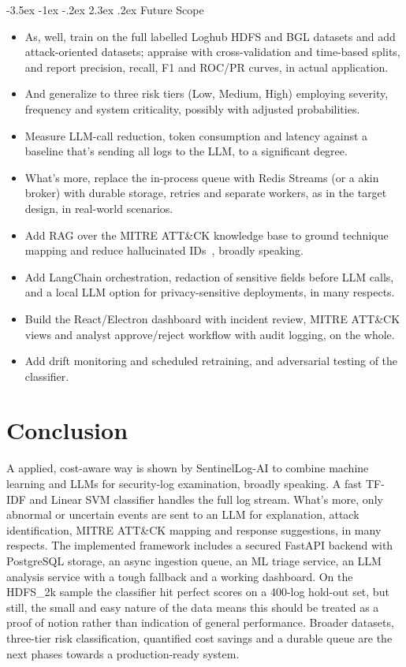 \documentclass[12pt,a4paper]{report}
\makeatletter
\renewcommand\section{\@startsection {section}{1}{\z@}%
  {-3.5ex \@plus -1ex \@minus -.2ex}%
  {2.3ex \@plus .2ex}%
  {\normalfont\fontsize{17}{21}\selectfont\bfseries}}
\makeatother
\begin{document}
\section{Future Scope}
\begin{itemize}[nosep]
  \item As, well, train on the full labelled Loghub HDFS and BGL datasets and add attack-oriented datasets; appraise with cross-validation and time-based splits, and report precision, recall, F1 and ROC/PR curves, in actual application.
  \item And generalize to three risk tiers (Low, Medium, High) employing severity, frequency and system criticality, possibly with adjusted probabilities.
  \item Measure LLM-call reduction, token consumption and latency against a baseline that's sending all logs to the LLM, to a significant degree.
  \item What's more, replace the in-process queue with Redis Streams (or a akin broker) with durable storage, retries and separate workers, as in the target design, in real-world scenarios.
  \item Add RAG over the MITRE ATT\&CK knowledge base to ground technique mapping and reduce hallucinated IDs~\cite{adediran2026}, broadly speaking.
  \item Add LangChain orchestration, redaction of sensitive fields before LLM calls, and a local LLM option for privacy-sensitive deployments, in many respects.
  \item Build the React/Electron dashboard with incident review, MITRE ATT\&CK views and analyst approve/reject workflow with audit logging, on the whole.
  \item Add drift monitoring and scheduled retraining, and adversarial testing of the classifier.
\end{itemize}

\chapter{Conclusion}
A applied, cost-aware way is shown by SentinelLog-AI to combine machine learning and LLMs for security-log examination, broadly speaking. A fast TF-IDF and Linear SVM classifier handles the full log stream. What's more, only abnormal or uncertain events are sent to an LLM for explanation, attack identification, MITRE ATT\&CK mapping and response suggestions, in many respects. The implemented framework includes a secured FastAPI backend with PostgreSQL storage, an async ingestion queue, an ML triage service, an LLM analysis service with a tough fallback and a working dashboard. On the HDFS\_2k sample the classifier hit perfect scores on a 400-log hold-out set, but still, the small and easy nature of the data means this should be treated as a proof of notion rather than indication of general performance. Broader datasets, three-tier risk classification, quantified cost savings and a durable queue are the next phases towards a production-ready system.
\end{document}
